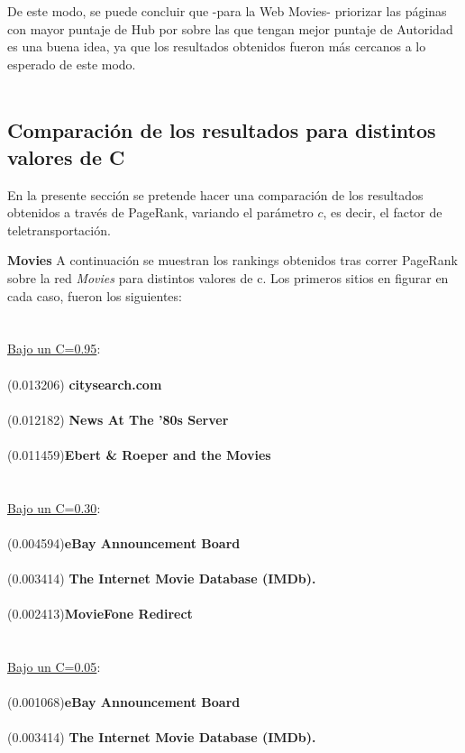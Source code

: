 \documentclass[a4paper]{article}
\begin{document}
\indent De este modo, se puede concluir que -para la Web Movies- priorizar las p\'aginas con mayor puntaje de Hub por sobre las que tengan mejor puntaje de Autoridad es una buena idea, ya que los resultados obtenidos fueron m\'as cercanos a lo esperado de este modo.\\
\\
\newpage
\subsection{Comparación de los resultados para distintos valores de C}
En la presente sección se pretende hacer una comparación de los resultados obtenidos a través de PageRank, variando el parámetro $c$, es decir, el factor de teletransportación.

\textbf{Movies}
\indent A continuaci\'on se muestran los rankings obtenidos tras correr PageRank sobre la red \emph{Movies} para distintos valores de c. Los primeros sitios en figurar en cada caso, fueron los siguientes: \\
\\
\\
\underline{Bajo un C=0.95}: \\
\\
(0.013206)\textbf{ citysearch.com }\\
\\
(0.012182) \textbf{News At The '80s Server}\\
\\
(0.011459)\textbf{Ebert \& Roeper and the Movies} \\
\\
\\
\underline{Bajo un C=0.30}: \\
\\
(0.004594)\textbf{eBay Announcement Board}\\
\\
(0.003414)\textbf{ The Internet Movie Database (IMDb). }\\
\\
(0.002413)\textbf{MovieFone Redirect}\\
\\
\\
\underline{Bajo un C=0.05}: \\
\\
(0.001068)\textbf{eBay Announcement Board}\\
\\
(0.003414) \textbf{The Internet Movie Database (IMDb).} \\
\\
\end{document}
